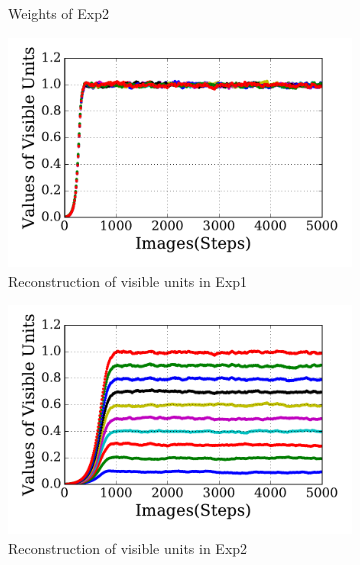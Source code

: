 \begin{figure}
\begin{subfigure}[t]{0.4\textwidth}
		\caption{Weights of Exp2}
	\end{subfigure}
	\begin{subfigure}[t]{0.4\textwidth}
		\includegraphics[width=\textwidth]{pics_sdlm/30_exp_RBM/exp1_recon_non.pdf}
		\caption{Reconstruction of visible units in Exp1}
	\end{subfigure}
	\begin{subfigure}[t]{0.4\textwidth}
		\includegraphics[width=\textwidth]{pics_sdlm/30_exp_RBM/exp2_recon_non.pdf}
		\caption{Reconstruction of visible units in Exp2}
	\end{subfigure}\\
	\begin{subfigure}[t]{0.4\textwidth}

\end{subfigure}
\end{figure}

